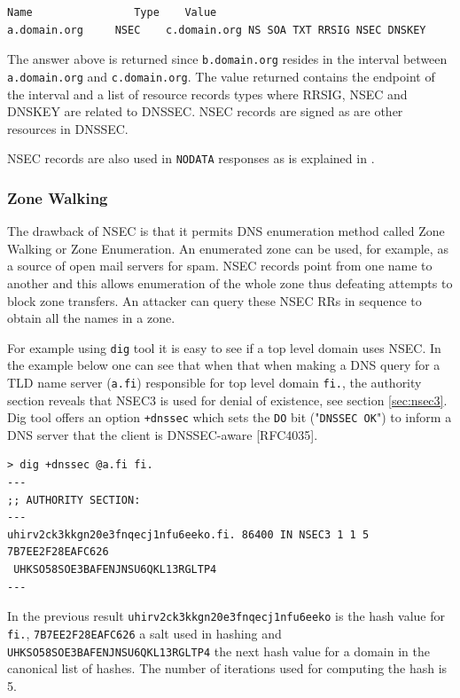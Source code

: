 \begin{verbatim}
Name	            Type    Value
a.domain.org     NSEC    c.domain.org NS SOA TXT RRSIG NSEC DNSKEY
\end{verbatim}

The answer above is returned since \texttt{b.domain.org} resides in the interval between \texttt{a.domain.org} and \texttt{c.domain.org}. The value returned contains the endpoint of the interval and a list of resource records types where RRSIG, NSEC and DNSKEY are related to DNSSEC. NSEC records are signed as are other resources in DNSSEC. 

NSEC records are also used in \texttt{NODATA} responses as is explained in \citep{RFC_7129}.


\subsubsection{Zone Walking}

The drawback of NSEC is that it permits DNS enumeration method called Zone Walking or Zone Enumeration. An enumerated zone can be used, for example, as a source of open mail servers for spam. NSEC records point from one name to another and this allows enumeration of the whole zone thus defeating attempts to block zone transfers. An attacker can query these NSEC RRs in sequence to obtain all the names in a zone. \citep{RFC3550} \citep{hacking_exposed} \citep{RFC_7129} 

For example using \texttt{dig} tool it is easy to see if a top level domain uses NSEC. In the example below one can see that when that when making a DNS query for a TLD name server (\texttt{a.fi}) responsible for top level domain \texttt{fi.}, the authority section reveals that NSEC3 is used for denial of existence, see section \ref{sec:nsec3}. Dig tool offers an option \texttt{+dnssec} which sets the \texttt{DO} bit ("\texttt{DNSSEC OK}") to inform a DNS server that the client is DNSSEC-aware [RFC4035].


\begin{verbatim}
> dig +dnssec @a.fi fi.
---
;; AUTHORITY SECTION:
---
uhirv2ck3kkgn20e3fnqecj1nfu6eeko.fi. 86400 IN NSEC3 1 1 5 7B7EE2F28EAFC626
 UHKSO58SOE3BAFENJNSU6QKL13RGLTP4
---
\end{verbatim}

In the previous result \texttt{uhirv2ck3kkgn20e3fnqecj1nfu6eeko} is the hash value for \texttt{fi.}, \texttt{7B7EE2F28EAFC626} a salt used in hashing and \texttt{UHKSO58SOE3BAFENJNSU6QKL13RGLTP4} the next hash value for a domain in the canonical list of hashes. The number of iterations used for computing the hash is 5. 

